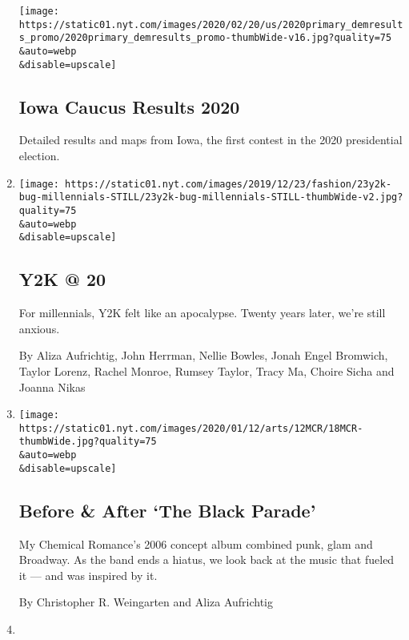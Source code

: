 \begin{enumerate}
  \texttt{[image: https://static01.nyt.com/images/2020/02/20/us/2020primary\_demresults\_promo/2020primary\_demresults\_promo-thumbWide-v16.jpg?quality=75\\\&auto=webp\\\&disable=upscale]}

  \hypertarget{iowa-caucus-results-2020}{%
  \subsection{Iowa Caucus Results 2020}\label{iowa-caucus-results-2020}}

  Detailed results and maps from Iowa, the first contest in the 2020
  presidential election.
\item
  \href{/interactive/2019/12/23/style/y2k-bug-millennials.html}{}

  \texttt{[image: https://static01.nyt.com/images/2019/12/23/fashion/23y2k-bug-millennials-STILL/23y2k-bug-millennials-STILL-thumbWide-v2.jpg?quality=75\\\&auto=webp\\\&disable=upscale]}

  \hypertarget{y2k--20}{%
  \subsection{Y2K @ 20}\label{y2k--20}}

  For millennials, Y2K felt like an apocalypse. Twenty years later,
  we're still anxious.

  By Aliza Aufrichtig, John Herrman, Nellie Bowles, Jonah Engel
  Bromwich, Taylor Lorenz, Rachel Monroe, Rumsey Taylor, Tracy Ma,
  Choire Sicha and Joanna Nikas
\item
  \href{/interactive/2019/12/18/arts/music/my-chemical-romance-black-parade.html}{}

  \texttt{[image: https://static01.nyt.com/images/2020/01/12/arts/12MCR/18MCR-thumbWide.jpg?quality=75\\\&auto=webp\\\&disable=upscale]}

  \hypertarget{before--after-the-black-parade}{%
  \subsection{Before \& After `The Black
  Parade'}\label{before--after-the-black-parade}}

  My Chemical Romance's 2006 concept album combined punk, glam and
  Broadway. As the band ends a hiatus, we look back at the music that
  fueled it --- and was inspired by it.

  By Christopher R. Weingarten and Aliza Aufrichtig
\item
  \href{/interactive/2019/11/06/us/politics/elizabeth-warren-policies-taxes.html}{}


\end{enumerate}
